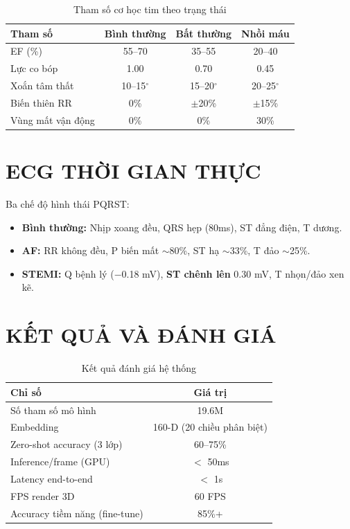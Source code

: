 \documentclass[journal]{IEEEtran}
\begin{document}
\begin{table}[H]
\centering
\caption{Tham số cơ học tim theo trạng thái}
\begin{tabular}{lccc}
\hline
\textbf{Tham số} & \textbf{Bình thường} & \textbf{Bất thường} & \textbf{Nhồi máu} \\
\hline
EF (\%) & 55--70 & 35--55 & 20--40 \\
Lực co bóp & 1.00 & 0.70 & 0.45 \\
Xoắn tâm thất & 10--15$^\circ$ & 15--20$^\circ$ & 20--25$^\circ$ \\
Biến thiên RR & 0\% & $\pm$20\% & $\pm$15\% \\
Vùng mất vận động & 0\% & 0\% & 30\% \\
\hline
\end{tabular}
\label{tab:cardiac_mechanics}
\end{table}

\section{ECG THỜI GIAN THỰC}

Ba chế độ hình thái PQRST:
\begin{itemize}
    \item \textbf{Bình thường:} Nhịp xoang đều, QRS hẹp (80ms), ST đẳng điện, T dương.
    \item \textbf{AF:} RR không đều, P biến mất $\sim$80\%, ST hạ $\sim$33\%, T đảo $\sim$25\%.
    \item \textbf{STEMI:} Q bệnh lý ($-$0.18 mV), \textbf{ST chênh lên} 0.30 mV, T nhọn/đảo xen kẽ.
\end{itemize}

\section{KẾT QUẢ VÀ ĐÁNH GIÁ}

\begin{table}[H]
\centering
\caption{Kết quả đánh giá hệ thống}
\begin{tabular}{lc}
\hline
\textbf{Chỉ số} & \textbf{Giá trị} \\
\hline
Số tham số mô hình & 19.6M \\
Embedding & 160-D (20 chiều phân biệt) \\
Zero-shot accuracy (3 lớp) & 60--75\% \\
Inference/frame (GPU)       & $<$ 50ms \\
Latency end-to-end          & $<$ 1s \\
FPS render 3D               & 60 FPS \\
Accuracy tiềm năng (fine-tune) & 85\%+ \\
\hline
\end{tabular}
\label{tab:results}
\end{table}
\end{document}
